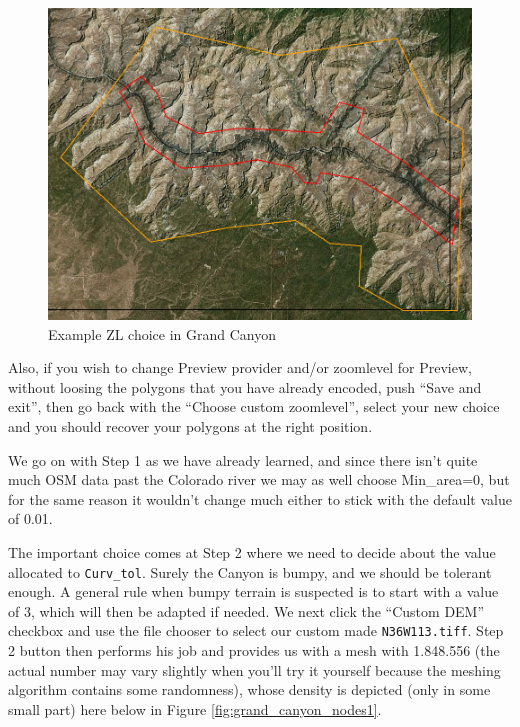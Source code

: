 \documentclass[12pt]{article}
\begin{document}
\begin{center}
\begin{figure}[!ht]
\begin{center}
\includegraphics[width=16cm]{Images/grand_canyon_select.png}
\caption{\label{fig:grand_canyon_select}Example ZL choice in Grand Canyon}
\end{center}
\end{figure}
\end{center}
Also, if you wish to change Preview provider and/or zoomlevel for Preview, without loosing the polygons that you have already encoded, push ``Save and exit'', then go back with the ``Choose custom zoomlevel'', select your new choice and you should recover your polygons at the right position.

\bigskip

We go on with Step 1 as we have already learned, and since there isn't quite much OSM data past the Colorado river we may as well choose Min\_area=0, but for the same reason it wouldn't change much either to stick with the default value of 0.01.

\medskip

The important choice comes at Step 2 where we need to decide about the value allocated to {\tt Curv\_tol}.
Surely the Canyon is bumpy, and we should be tolerant enough. A general rule when bumpy terrain is suspected is to start with a value of 3, which will then be adapted if needed.
We next click the ``Custom DEM'' checkbox and use the file chooser to select our custom made {\tt N36W113.tiff}.
Step 2 button then performs his job and provides us with a mesh with 1.848.556 (the actual number may vary slightly when you'll try it yourself because the meshing algorithm contains some randomness), whose density is depicted (only in some small part) here below in Figure \ref{fig:grand_canyon_nodes1}.
\end{document}
